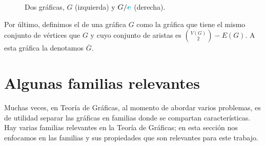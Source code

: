 \begin{figure}[htb!]
    \centering
    \caption{Dos gr\'aficas, $G$ (izquierda) y
    $G/{\color{azulCielo}\boldsymbol{e}}$ (derecha).}
\label{fig:ex-contract}
\end{figure}

Por \'ultimo, definimos el  de una gr\'afica
$G$ como la gr\'afica que tiene el mismo conjunto de v\'ertices que $G$ y cuyo
conjunto de aristas es $\binom{V(G)}{2} - E(G)$. A esta gr\'afica la denotamos
$\overline{G}$.

\newpage

\section{Algunas familias relevantes}
\label{sec:famGraf}
   
Muchas veces, en Teor\'ia de Gr\'aficas, al momento de abordar varios problemas,
es de utilidad separar las gr\'aficas en familias donde se compartan
caracter\'isticas. Hay varias familias relevantes en la Teor\'ia de Gr\'aficas;
en esta secci\'on nos enfocamos en las familias y sus propiedades que son
relevantes para este trabajo.

